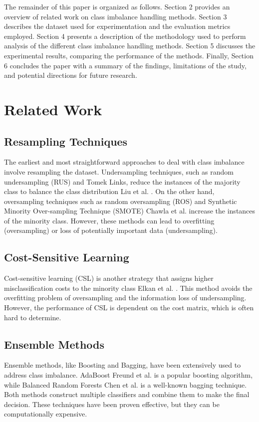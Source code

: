 \documentclass[journal]{IEEEtran}
\begin{document}
	The remainder of this paper is organized as follows. Section 2 provides an overview of related work on class imbalance handling methods. Section 3 describes the dataset used for experimentation and the evaluation metrics employed. Section 4 presents a description of the methodology used to perform analysis of the different class imbalance handling methods. Section 5 discusses the experimental results, comparing the performance of the methods. Finally, Section 6 concludes the paper with a summary of the findings, limitations of the study, and potential directions for future research.
	
	\section{Related Work}
	\label{sec:related_work}
	
	
	
	\subsection{Resampling Techniques}
	
	
	
	
The earliest and most straightforward approaches to deal with class imbalance involve resampling the dataset. Undersampling techniques, such as random undersampling (RUS) and Tomek Links, reduce the instances of the majority class to balance the class distribution Liu et al. \cite{liu2009}. On the other hand, oversampling techniques such as random oversampling (ROS) and Synthetic Minority Over-sampling Technique (SMOTE) Chawla et al. \cite{chawla2002} increase the instances of the minority class. However, these methods can lead to overfitting (oversampling) or loss of potentially important data (undersampling).

\subsection{Cost-Sensitive Learning}

Cost-sensitive learning (CSL) is another strategy that assigns higher misclassification costs to the minority class Elkan et al. \cite{elkan2001}. This method avoids the overfitting problem of oversampling and the information loss of undersampling. However, the performance of CSL is dependent on the cost matrix, which is often hard to determine.

\subsection{Ensemble Methods} 
Ensemble methods, like Boosting and Bagging, have been extensively used to address class imbalance. AdaBoost Freund et al. \cite{freund1997} is a popular boosting algorithm, while Balanced Random Forests Chen et al. \cite{chen2004} is a well-known bagging technique. Both methods construct multiple classifiers and combine them to make the final decision. These techniques have been proven effective, but they can be computationally expensive.
\end{document}
